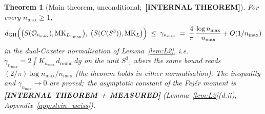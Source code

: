 \documentclass[11pt,a4paper]{article}
\theoremstyle{plain}
\newtheorem{theorem}{Theorem}[section]
\theoremstyle{definition}
\newcommand{\nmax}{n_{\max}}
\newcommand{\sthree}{S^{3}}
\newcommand{\Op}{\mathcal{O}}
\newcommand{\KS}{K}
\newcommand{\gvq}[2]{#2}
\begin{document}
\begin{theorem}[Main theorem, unconditional;\ \textbf{[INTERNAL THEOREM]}]
\label{thm:main_unconditional}
For every $\nmax \ge 1$,
\begin{equation}\label{eq:unconditional_bound}
d_{\mathrm{GH}}\Bigl( \bigl(S(\Op_{\nmax}),
\mathrm{MK}_{L_{\nmax}}\bigr),\;
\bigl(S(C(\sthree)), \mathrm{MK}_{L}\bigr) \Bigr)
\;\le\; \gamma_{\nmax}
\;=\; \gvq{l2_rate_4_over_pi}{\frac{4}{\pi}}\,\frac{\log \nmax}{\nmax} + O(1/\nmax)
\end{equation}
in the dual-Coxeter normalisation of Lemma~\ref{lem:L2}, i.e.\
$\gamma_{\nmax} = 2\int \KS_{\nmax}\, d_{\mathrm{round}}\, dg$ on the
unit $\sthree$, where the same bound reads $(2/\pi)\log\nmax/\nmax$
(the theorem holds in either normalisation).
The inequality and $\gamma_{\nmax} \to 0$ are proved;\ the asymptotic
constant of the Fej\'er moment is \textbf{[INTERNAL THEOREM + MEASURED]}
(Lemma~\ref{lem:L2}(d.ii), Appendix~\ref{app:stein_weiss}).


\end{theorem}
\end{document}
